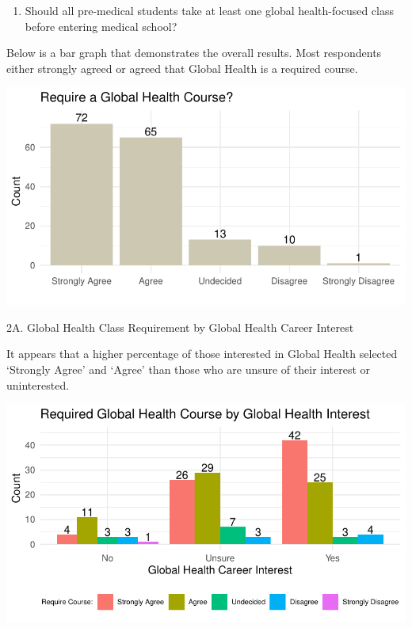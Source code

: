 \documentclass[
  letterpaper,
  DIV=11,
  numbers=noendperiod]{scrartcl}
\providecommand{\tightlist}{%
  \setlength{\itemsep}{0pt}\setlength{\parskip}{0pt}}\usepackage{longtable,booktabs,array}
\begin{document}
\newpage

\begin{enumerate}
\def\labelenumi{\arabic{enumi}.}
\setcounter{enumi}{1}
\tightlist
\item
  Should all pre-medical students take at least one global
  health-focused class before entering medical school?
\end{enumerate}

Below is a bar graph that demonstrates the overall results. Most
respondents either strongly agreed or agreed that Global Health is a
required course.

\includegraphics{GlobalHealthQuartoHC_files/figure-pdf/unnamed-chunk-22-1.pdf}

\newpage

2A. Global Health Class Requirement by Global Health Career Interest

It appears that a higher percentage of those interested in Global Health
selected `Strongly Agree' and `Agree' than those who are unsure of their
interest or uninterested.

\includegraphics{GlobalHealthQuartoHC_files/figure-pdf/unnamed-chunk-23-1.pdf}
\end{document}
